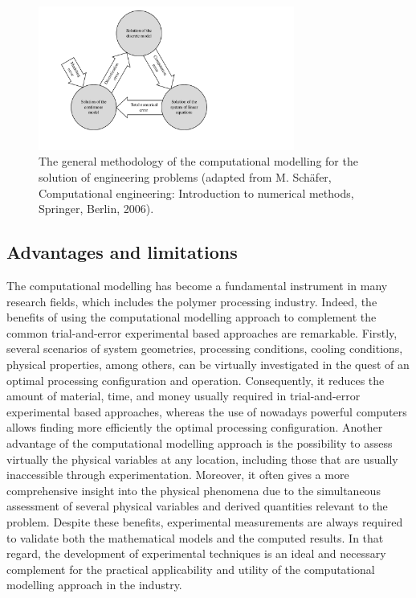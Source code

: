 \begin{figure}[!htb]
\centering
\includegraphics[width=0.75\textwidth]{chap1/include/figures/computational_modelling_error.pdf}
\caption[Numerical errors of the computational modelling for the solution of engineering problems.]{The general methodology of the computational modelling for the solution of engineering problems (adapted from M. Sch\"afer, Computational engineering: Introduction to numerical methods, Springer, Berlin, 2006).}
\label{chap1:fig:computational_modelling_computational_error}
\end{figure}

\subsection{Advantages and limitations}
\label{chap1:subsec:computational_modelling_advantages_and_limitations}

The computational modelling has become a fundamental instrument in many research fields, which includes the polymer processing industry.
Indeed, the benefits of using the computational modelling approach to complement the common trial-and-error experimental based approaches are remarkable.
Firstly, several scenarios of system geometries, processing conditions, cooling conditions, physical properties, among others, can be virtually investigated in the quest of an optimal processing configuration and operation.
Consequently, it reduces the amount of material, time, and money usually required in trial-and-error experimental based approaches, whereas the use of nowadays powerful computers allows finding more efficiently the optimal processing configuration.
Another advantage of the computational modelling approach is the possibility to assess virtually the physical variables at any location, including those that are usually inaccessible through experimentation.
Moreover, it often gives a more comprehensive insight into the physical phenomena due to the simultaneous assessment of several physical variables and derived quantities relevant to the problem.
Despite these benefits, experimental measurements are always required to validate both the mathematical models and the computed results.
In that regard, the development of experimental techniques is an ideal and necessary complement for the practical applicability and utility of the computational modelling approach in the industry.

